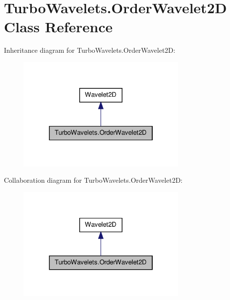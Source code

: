\hypertarget{class_turbo_wavelets_1_1_order_wavelet2_d}{\section{\-Turbo\-Wavelets.\-Order\-Wavelet2\-D \-Class \-Reference}
\label{class_turbo_wavelets_1_1_order_wavelet2_d}
}


\-Inheritance diagram for \-Turbo\-Wavelets.\-Order\-Wavelet2\-D\-:
\nopagebreak
\begin{figure}[H]
\begin{center}
\leavevmode
\includegraphics[width=238pt]{class_turbo_wavelets_1_1_order_wavelet2_d__inherit__graph}
\end{center}
\end{figure}


\-Collaboration diagram for \-Turbo\-Wavelets.\-Order\-Wavelet2\-D\-:
\nopagebreak
\begin{figure}[H]
\begin{center}
\leavevmode
\includegraphics[width=238pt]{class_turbo_wavelets_1_1_order_wavelet2_d__coll__graph}
\end{center}
\end{figure}
